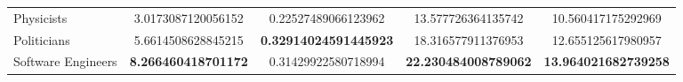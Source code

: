{\begin{tabular}{lSSSS}
    Physicists           & 3.0173087120056152                                & 0.22527489066123962                                 & 13.577726364135742                                 & 10.560417175292969                                 \\
    Politicians          & 5.6614508628845215                                &  \bfseries 0.32914024591445923 & 18.316577911376953                                 & 12.655125617980957                                 \\
    Software Engineers   &  \bfseries 8.266460418701172 & 0.31429922580718994                                 &  \bfseries 22.230484008789062 &  \bfseries 13.964021682739258 \\
    \bottomrule
  \end{tabular}
}

